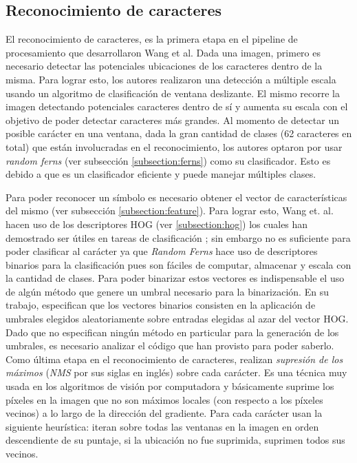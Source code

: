 \subsection{Reconocimiento de caracteres}
	
	El reconocimiento de caracteres, es la primera etapa en el pipeline de procesamiento que desarrollaron Wang et al. Dada una imagen, primero es necesario detectar las potenciales ubicaciones de los caracteres dentro de la misma. Para lograr esto, los autores realizaron una detección a múltiple escala usando un algoritmo de clasificación de ventana deslizante. El mismo recorre la imagen detectando potenciales caracteres dentro de sí y aumenta su escala con el objetivo de poder detectar caracteres más grandes. Al momento de detectar un posible carácter en una ventana, dada la gran cantidad de clases (62 caracteres en total) que están involucradas en el reconocimiento, los autores optaron por usar \textit{random ferns} (ver subsección \ref{subsection:ferns}) como su clasificador. Esto es debido a que es un clasificador eficiente y puede manejar múltiples clases.
	
	Para poder reconocer un símbolo es necesario obtener el vector de características del mismo (ver subsección \ref{subsection:feature}). Para lograr esto, Wang et. al. hacen uso de los descriptores HOG (ver \ref{subsection:hog}) los cuales han demostrado ser útiles en tareas de clasificación \cite{DT05}; sin embargo no es suficiente para poder clasificar al carácter ya que \textit{Random Ferns} hace uso de descriptores binarios para la clasificación pues son fáciles de computar, almacenar y escala con la cantidad de clases. Para poder binarizar estos vectores es indispensable el uso de algún método que genere un umbral necesario para la binarización. En su trabajo, especifican que los vectores binarios consisten en la aplicación de umbrales elegidos aleatoriamente sobre entradas elegidas al azar del vector HOG. Dado que no especifican ningún método en particular para la generación de los umbrales, es necesario analizar el código que han provisto para poder saberlo. Como última etapa en el reconocimiento de caracteres, realizan \textit{supresión de los máximos} (\textit{NMS} por sus siglas en inglés) sobre cada carácter. Es una técnica muy usada en los algoritmos de visión por computadora  y básicamente suprime los píxeles en la imagen que no son máximos locales (con respecto a los píxeles vecinos) a lo largo de la dirección del gradiente. Para cada carácter  usan la siguiente heurística: iteran sobre todas las ventanas en la imagen en orden descendiente de su puntaje, si la ubicación no fue suprimida, suprimen todos sus vecinos.
	
